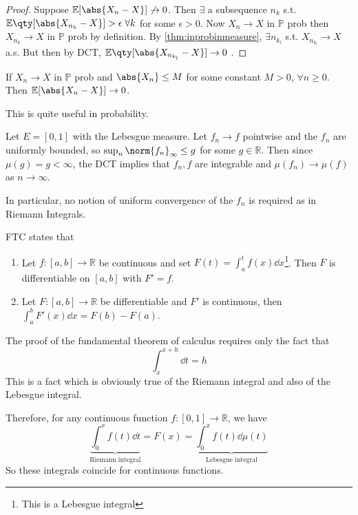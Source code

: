 \begin{proof}
	Suppose $\mathbb{E}[\abs{X_n - X}] \not\to 0$.
	Then $\exists$ a subsequence $n_k$ s.t. $\mathbb{E}\qty[\abs{X_{n_k} - X}] > \epsilon \; \forall k$ for some $\epsilon > 0$.
	Now $X_n \to X$ in $\mathbb{P}$ prob then $X_{n_k} \to X$ in $\mathbb{P}$ prob by definition.
	By \cref{thm:inprobinmeasure}, $\exists n_{k_{l}}$ s.t. $X_{n_{k_l}} \to X$ a.s.
	But then by DCT, $\mathbb{E}\qty[\abs{X_{n_{k_l}} - X}] \to 0$ \Lightning.
\end{proof}

\begin{theorem}
	If $X_n \to X$ in $\mathbb{P}$ prob and $\abs{X_n} \leq M$ for some constant $M > 0$, $\forall n \geq 0$.
	Then $\mathbb{E}[\abs{X_n - X}] \to 0$.
\end{theorem}

This is quite useful in probability.

\begin{example}
	Let $E = [0,1]$ with the Lebesgue measure.
	Let $f_n \to f$ pointwise and the $f_n$ are uniformly bounded, so $\sup_n \norm{f_n}_\infty \leq g$ for some $g \in \mathbb R$.
	Then since $\mu(g) = g < \infty$, the DCT implies that $f_n, f$ are integrable and $\mu(f_n) \to \mu(f)$ as $n \to \infty$.

	In particular, no notion of uniform convergence of the $f_n$ is required as in Riemann Integrals.
\end{example}

\begin{remark}
	FTC states that
	\begin{enumerate}
		\item Let $f : [a, b] \to \mathbb{R}$ be continuous and set $F(t) = \int_{a}^{t} f(x) \dd{x}$\footnote{This is a Lebesgue integral}.
		Then $F$ is differentiable on $[a, b]$ with $F' = f$.
		\item Let $F : [a, b] \to \mathbb{R}$ be differentiable and $F'$ is continuous, then $\int_{a}^{b} F'(x) \dd{x} = F(b) - F(a)$.
	\end{enumerate}
	The proof of the fundamental theorem of calculus requires only the fact that
	\[ \int_x^{x + h} \dd{t} = h \]
	This is a fact which is obviously true of the Riemann integral and also of the Lebesgue integral.

	Therefore, for any continuous function $f \colon [0,1] \to \mathbb R$, we have
	\[ \underbrace{\int_0^x f(t) \dd{t}}_{\text{Riemann integral}} = F(x) = \underbrace{\int_0^x f(t) \dd{\mu(t)}}_{\text{Lebesgue integral}} \]
	So these integrals coincide for continuous functions.
\end{remark}

